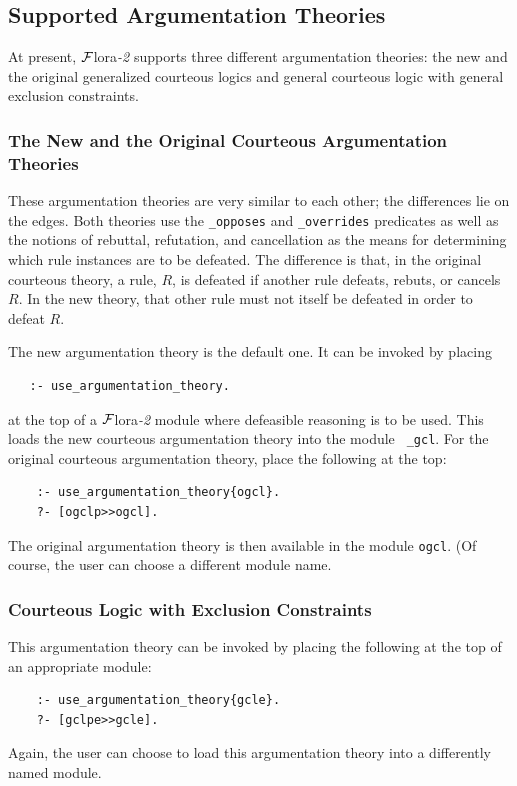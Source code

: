 \documentclass[11pt]{article}
\newcommand{\FLORA}{{\mbox{\sc ${\cal F}${lora}\rm\emph{-2}}}\xspace}
\begin{document}
\subsection{Supported Argumentation Theories}\label{sec-exclusion-constr}

At present, \FLORA supports three different argumentation theories: the new
and the original generalized courteous logics and general courteous
logic with general exclusion constraints.

\subsubsection{The New and the Original Courteous Argumentation Theories}

These argumentation theories are very similar to each other; the
differences lie on the edges. Both theories use the {\tt \_opposes} and
{\tt \_overrides} predicates as well as the notions of rebuttal,
refutation, and cancellation as the means for determining which rule
instances are to be defeated. The difference is that, in the original courteous
theory, a rule, $R$, is defeated if another rule defeats, rebuts, or
cancels $R$.
In the new theory, that other rule must not itself be defeated in order to
defeat $R$.

The new argumentation theory is the default one. It can be invoked by placing
\begin{verbatim}
   :- use_argumentation_theory.
\end{verbatim}
at the top of a \FLORA module where defeasible reasoning is to be used.
This loads the new courteous argumentation theory into the module {\tt
  \_gcl}. For the original courteous argumentation theory, place the
following at the top:
\begin{verbatim}
    :- use_argumentation_theory{ogcl}.
    ?- [ogclp>>ogcl].
\end{verbatim}
The original argumentation theory is then available in the module {\tt ogcl}.
(Of course, the user can choose a different module name.

\subsubsection{Courteous Logic with Exclusion Constraints}

This argumentation theory can be invoked by placing the following at the
top of an appropriate module:
\begin{verbatim}
    :- use_argumentation_theory{gcle}.
    ?- [gclpe>>gcle].
\end{verbatim}
Again, the user can choose to load this argumentation theory into a
differently named module.
\end{document}
